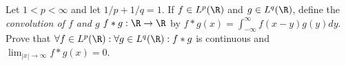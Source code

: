 Let $1<p<\infty$ and let $1/p+1/q=1$. If $f\in L^p(\R)$ and $g\in
L^q(\R)$, define the \emph{convolution of $f$ and $g$} $f*g:\R\rightarrow \R$
by $f*g(x)=\int_{-\infty}^{\infty}f(x-y)g(y)dy$. Prove that 
$\forall f\in L^p(\R):\forall g\in L^q(\R): f*g$ is continuous
and $\lim_{|x|\rightarrow \infty}f*g(x)=0$. 

